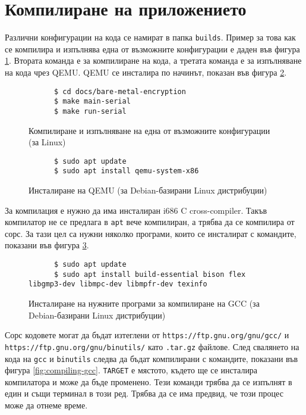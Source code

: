   \section{Компилиране на приложението}
  Различни конфигурации на кода се намират в папка {\tt builds}. Пример за това как се компилира и изпълнява една от възможните конфигурации е даден във фигура \ref{fig:build-making}. Втората команда е за компилиране на кода, а третата команда е за изпълняване на кода чрез QEMU. QEMU се инсталира по начинът, показан във фигура \ref{fig:installing-qemu}.

  \begin{figure}[ht]
    \centering
    \begin{verbatim}
      $ cd docs/bare-metal-encryption
      $ make main-serial
      $ make run-serial
    \end{verbatim}
    \caption{Компилиране и изпълняване на една от възможните конфигурации (за Linux)}
    \label{fig:build-making}
  \end{figure}

  \begin{figure}[ht]
    \centering
    \begin{verbatim}
      $ sudo apt update
      $ sudo apt install qemu-system-x86
    \end{verbatim}
    \caption{Инсталиране на QEMU (за Debian-базирани Linux дистрибуции)}
    \label{fig:installing-qemu}
  \end{figure}

  За компилация е нужно да има инсталиран i686 C cross-compiler. Такъв компилатор не се предлага в {\tt apt} вече компилиран, а трябва да се компилира от сорс. За тази цел са нужни няколко програми, които се инсталират с командите, показани във фигура \ref{fig:gcc-requirements}.

  \begin{figure}[ht]
    \centering
    \begin{verbatim}
      $ sudo apt update
      $ sudo apt install build-essential bison flex libgmp3-dev libmpc-dev libmpfr-dev texinfo
    \end{verbatim}
    \caption{Инсталиране на нужните програми за компилиране на GCC (за Debian-базирани Linux дистрибуции)}
    \label{fig:gcc-requirements}
  \end{figure}

  Сорс кодовете могат да бъдат изтеглени от {\tt https://ftp.gnu.org/gnu/gcc/} и {\tt https://ftp.gnu.org/gnu/binutils/} като {\tt .tar.gz} файлове. След свалянето на кода на {\tt gcc} и {\tt binutils} следва да бъдат компилирани с командите, показани във фигура \ref{fig:compiling-gcc}.
  {\tt TARGET} е мястото, където ще се инсталира компилатора и може да бъде променено. Тези команди трябва да се изпълнят в един и същи терминал в този ред.
  Трябва да се има предвид, че този процес може да отнеме време.

